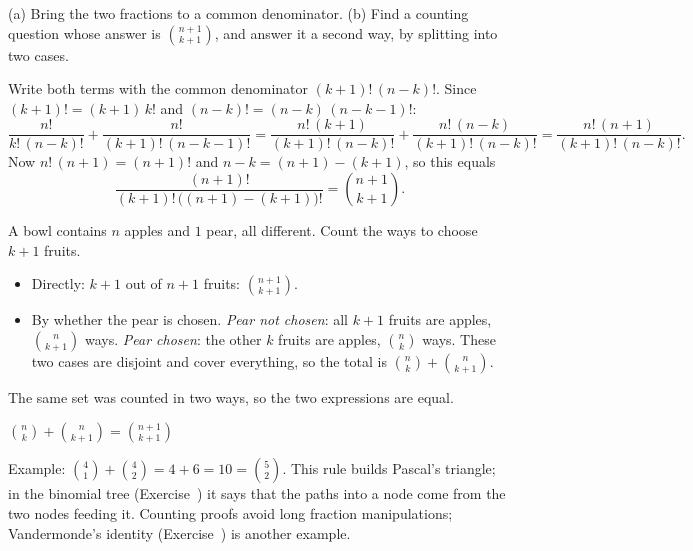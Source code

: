 \begin{solution}
	\idea (a) Bring the two fractions to a common denominator. (b) Find a
	counting question whose answer is $\binom{n+1}{k+1}$, and answer it a second
	way, by splitting into two cases.

	 Write both terms with the common denominator
	$(k+1)!\,(n-k)!$. Since $(k+1)!=(k+1)\,k!$ and $(n-k)!=(n-k)\,(n-k-1)!$:
	\[
		\frac{n!}{k!\,(n-k)!}+\frac{n!}{(k+1)!\,(n-k-1)!}
		=\frac{n!\,(k+1)}{(k+1)!\,(n-k)!}+\frac{n!\,(n-k)}{(k+1)!\,(n-k)!}
		=\frac{n!\,(n+1)}{(k+1)!\,(n-k)!}.
	\]
	Now $n!\,(n+1)=(n+1)!$ and $n-k=(n+1)-(k+1)$, so this equals
	\[ \frac{(n+1)!}{(k+1)!\,\big((n+1)-(k+1)\big)!}=\binom{n+1}{k+1}. \]

	 A bowl contains $n$
	apples and $1$ pear, all different. Count the ways to choose $k+1$ fruits.
	\begin{itemize}[nosep]
		\item Directly: $k+1$ out of $n+1$ fruits: $\binom{n+1}{k+1}$.
		\item By whether the pear is chosen. \emph{Pear not chosen}: all $k+1$
		      fruits are apples, $\binom n{k+1}$ ways. \emph{Pear chosen}: the
		      other $k$ fruits are apples, $\binom nk$ ways. These two cases are
		      disjoint and cover everything, so the total is
		      $\binom nk+\binom n{k+1}$.
	\end{itemize}
	The same set was counted in two ways, so the two expressions are equal.
	\begin{answer}
		$\binom nk+\binom n{k+1}=\binom{n+1}{k+1}$
	\end{answer}
	\begin{remark}
		Example: $\binom41+\binom42=4+6=10=\binom52$. This rule builds Pascal's
		triangle; in the binomial tree (Exercise~) it says
		that the paths into a node come from the two nodes feeding it.
		Counting proofs avoid long fraction manipulations; Vandermonde's identity
		(Exercise~) is another example.
	\end{remark}
\end{solution}
